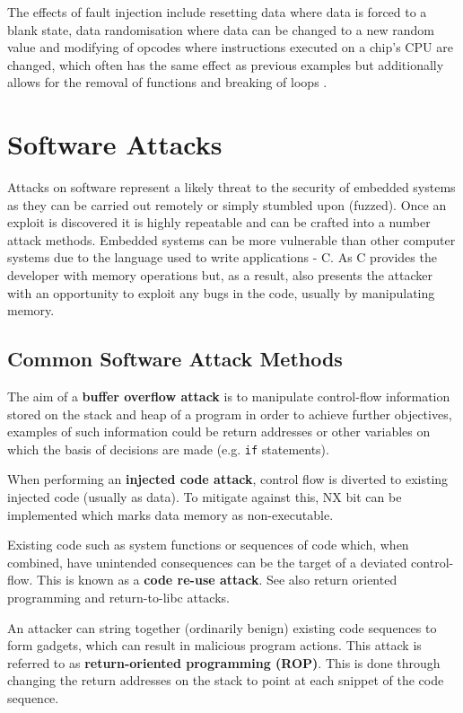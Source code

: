 The effects of fault injection include resetting data where data is forced to a blank state, data randomisation where data can be changed to a new random value and modifying of opcodes where instructions executed on a chip's CPU are changed, which often has the same effect as previous examples but additionally allows for the removal of functions and breaking of loops \cite{Anderson1996}.

\section{Software Attacks}

Attacks on software represent a likely threat to the security of embedded systems as they can be carried out remotely or simply stumbled upon (fuzzed). Once an exploit is discovered it is highly repeatable and can be crafted into a number attack methods. Embedded systems can be more vulnerable than other computer systems due to the language used to write applications - C. As C provides the developer with memory operations but, as a result, also presents the attacker with an opportunity to exploit any bugs in the code, usually by manipulating memory.

\subsection{Common Software Attack Methods}

The aim of a \textbf{buffer overflow attack} is to manipulate control-flow information stored on the stack and heap of a program in order to achieve further objectives, examples of such information could be return addresses or other variables on which the basis of decisions are made (e.g. \verb|if| statements).

When performing an \textbf{injected code attack}, control flow is diverted to existing injected code (usually as data). To mitigate against this, NX bit can be implemented which marks data memory as non-executable.

Existing code such as system functions or sequences of code which, when combined, have unintended consequences can be the target of a deviated control-flow. This is known as a \textbf{code re-use attack}. See also return oriented programming and return-to-libc attacks.

An attacker can string together (ordinarily benign) existing code sequences to form gadgets, which can result in malicious program actions. This attack is referred to as \textbf{return-oriented programming (ROP)}. This is done through changing the return addresses on the stack to point at each snippet of the code sequence.

